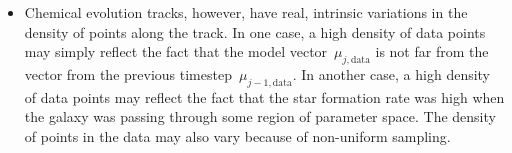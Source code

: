 \documentclass[ms.tex]{subfiles}
\begin{document}
\begin{itemize}
	\item Chemical evolution tracks, however, have real, intrinsic variations
	in the density of points along the track.
	In one case, a high density of data points may simply reflect the fact that
	the model vector~$\mu_{j,\text{data}}$ is not far from the vector from the
	previous timestep~$\mu_{j - 1,\text{data}}$.
	In another case, a high density of data points may reflect the fact that
	the star formation rate was high when the galaxy was passing through some
	region of parameter space.
	The density of points in the data may also vary because of non-uniform
	sampling.


\end{itemize}
\end{document}
